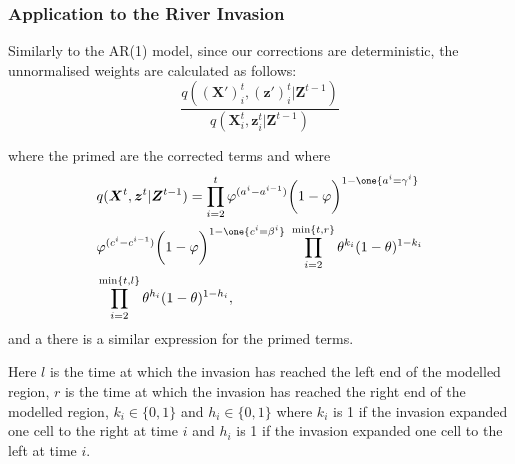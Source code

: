 \documentclass[9pt, xcolor={dvipsnames,svgnames,table}]{beamer}
\begin{document}
\begin{frame}
\frametitle{Application to the River Invasion}

Similarly to the AR(1) model, since our corrections are deterministic, the unnormalised weights are calculated as follows:
\begin{equation*}
    \frac{q(\bm{(X')}^{t}_i,\bm{(z')}^{t}_i | \bm{Z}^{t-1})}{q(\bm{X}^{t}_i,\bm{z}^{t}_i | \bm{Z}^{t-1})}
\end{equation*}

where the primed are the corrected terms and where
\begin{align*}
    & q(\bm{X}^{t},\bm{z}^{t} | \bm{Z}^{t-1}) =  \prod_{i=2}^{t} \varphi^{(a^{i} - a^{i-1})}\bigg(1 - \varphi \bigg)^{1-\one {a^i=\gamma^i}} \nonumber \\
    & \varphi^{(c^{i} - c^{i-1})} \bigg(1 - \varphi\bigg)^{1-\one {c^i=\beta^i}} \; \prod_{i=2}^{\min\{t,r\}} \theta^{k_i} (1-\theta)^{1-k_i}  \label{eq:4} \\ 
    & \prod_{i=2}^{\min\{t,l\}} \theta^{h_i} (1-\theta)^{1-h_i} \nonumber,
\end{align*}
and a there is a similar expression for the primed terms.

Here $l$ is the time at which the invasion has reached the left end of the modelled region, $r$ is the time at which the invasion has reached the right end of the modelled region, $k_i \in \{0,1\}$ and $h_i \in \{0,1\}$ where $k_i$ is 1 if the invasion expanded one cell to the right at time $i$ and $h_i$ is 1 if the invasion expanded one cell to the left at time $i$.

\end{frame}
\end{document}
